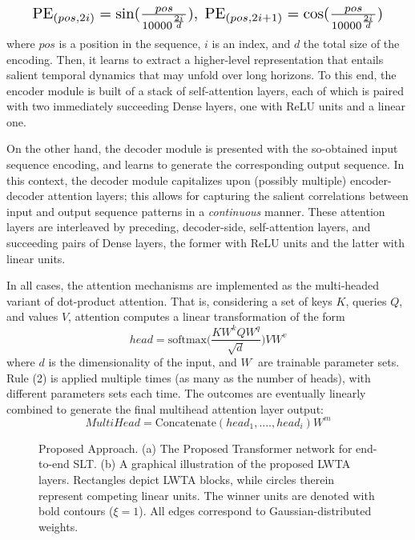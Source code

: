 \documentclass[10pt,twocolumn,letterpaper]{article}
\begin{document}
\begin{equation}
\resizebox{0.91\hsize}{!}{$\textrm{PE}_{(pos,2i)} = \textrm{sin}(\frac{pos}{10000^{\frac{2i}{d}}}),  \; \textrm{PE}_{(pos,2i+1)} = \textrm{cos}(\frac{pos}{10000^{\frac{2i}{d}}})$}
\end{equation}
where $pos$ is a position in the sequence, $i$ is an index, and $d$ the total size of the encoding. Then, it learns to extract a higher-level representation that entails salient temporal dynamics that may unfold over long horizons. To this end, the encoder module is built of a stack of self-attention layers, each of which is paired with two immediately succeeding Dense layers, one with ReLU units and a linear one.

On the other hand, the decoder module is presented with the so-obtained input sequence encoding, and learns to generate the corresponding output sequence. In this context, the decoder module capitalizes upon (possibly multiple) encoder-decoder attention layers; this allows for capturing the salient correlations between input and output sequence patterns in a \emph{continuous} manner. These attention layers are interleaved by preceding, decoder-side, self-attention layers, and succeeding pairs of Dense layers, the former with ReLU units and the latter with linear units. 

In all cases, the attention mechanisms are implemented as the multi-headed variant of dot-product attention. That is, considering a set of keys $K$, queries $Q$, and values $V$, attention computes a linear transformation of the form 
\begin{equation}
\label{eqn:scaledatt}
head = \mathrm{softmax}\big(\frac{KW^kQW^q}{\sqrt{d}}\big)VW^v
\end{equation}
where $d$ is the dimensionality of the input, and $W^\cdot$ are trainable parameter sets. Rule (2) is applied multiple times (as many as the number of heads), with different parameters sets each time. The outcomes are eventually linearly combined to generate the final multihead attention layer output:
\begin{equation}
\label{eqn:multihead}
MultiHead = \mathrm{Concatenate}(head_1,....,head_i)W^m
\end{equation}



\begin{figure*}\centering
    \hspace{-5mm}
     \qquad
   \qquad
    \caption{ Proposed Approach. (a) The Proposed Transformer network for end-to-end SLT. (b) A graphical illustration of the proposed LWTA layers. Rectangles depict LWTA blocks, while circles therein represent competing linear units. The winner units are denoted with bold contours ($\xi=1$). All edges correspond to Gaussian-distributed weights.} \label{fig:fullmodel}\end{figure*}
\end{document}
